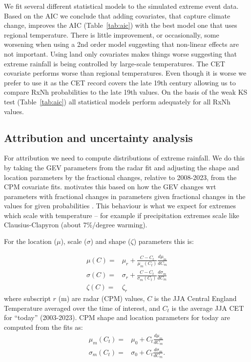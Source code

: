 \documentclass[11pt,a4paper]{article}
\begin{document}
We fit several different statistical models to the simulated  extreme event data. Based on the AIC we conclude that adding covariates, that capture climate change, improves the AIC (Table~\ref{tab:aic}) with the best model one that uses regional temperature. There is little improvement, or occasionally, some worsening when using a 2nd order model suggesting that non-linear effects are not important. Using land only covariates makes things worse suggesting that extreme rainfall is being controlled by large-scale temperatures.  The CET covariate performs worse than  regional  temperatures. Even though it is worse we prefer to use it as the CET record covers the late 19th century allowing us to compare RxNh probabilities to the late 19th values. On the basis of the weak KS test (Table~\ref{tab:aic}) all statistical models perform adequately for all RxNh values. 

\subsection{Attribution and uncertainty analysis}

For attribution we need to compute distributions of extreme rainfall. We do this by taking the GEV parameters from the  radar fit and adjusting the shape and location parameters by the fractional changes, relative to 2008-2023, from the CPM covariate fits.\cite{tett2023edinburgh} motivates this based on how the GEV changes wrt parameters with fractional changes in parameters given fractional changes in the values for given probabilities \parencite{Coles_2001}. This behaviour is what we expect for extremes which scale with temperature -- for example if precipitation extremes scale like Clausius-Clapyron (about 7\%/degree warming). 

For the location ($\mu$), scale ($\sigma$) and shape ($\zeta$) parameters this is:

\begin{equation}\label{eq:gev_params}
\begin{aligned}
\mu(C) =& \mu_r +  \frac{C-C_t}{\mu_m(C_t)} \frac{d\mu_m}{dC_m}\\
\sigma(C) =& \sigma_r +  \frac{C-C_t}{\sigma_m(C_t)} \frac{d\sigma_m}{dC_m}\\
\zeta(C)=&\zeta_r
\end{aligned}
\end{equation}
where subscript $r$ (m) are radar (CPM) values, $C$ is the JJA Central England Temperature averaged over the time of interest, and $C_t$ is the average JJA CET for ``today'' (2003-2023). CPM shape and location parameters for today are  computed from the fits as:
\begin{equation}\label{eq:gev_ref}
\begin{aligned}
	\mu_m(C_t)=& \mu_0 + C_t  \frac{d\mu_m}{dC_m}\\
	\sigma_m(C_t)=& \sigma_0 + C_t  \frac{d\sigma_m}{dC_m}.
\end{aligned}
\end{equation}
\end{document}
